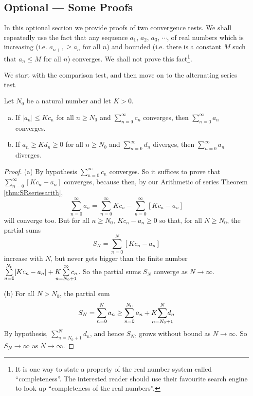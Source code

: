 \subsection{Optional --- Some Proofs}\label{sec:CompProof}

In this optional section we provide proofs of two convergence tests.
We shall repeatedly use the fact that any sequence $a_1$, $a_2$, $a_3$,
$\cdots$, of real numbers which is increasing
(i.e. $a_{n+1}\ge a_n$ for all $n$) and bounded (i.e. there is a constant $M$
such that $a_n\le M$ for all $n$) converges. We shall not prove this
fact\footnote{It is one way to state a property of the real number system
called ``completeness''. The interested reader should use their
favourite search engine to look up ``completeness of the real numbers''.}.

We start with the comparison test, and then move on to the
alternating series test.
\begin{theorem}
Let $N_0$ be a natural number and let $K>0$.
\begin{enumerate}[(a)]
\item If $|a_n|\le K c_n$ for all $n\ge N_0$ and
$\sum\limits_{n=0}^\infty c_n$ converges, then
$\sum\limits_{n=0}^\infty a_n$ converges.
\item If $a_n\ge K d_n\ge0 $ for all $n\ge N_0$ and
$\sum\limits_{n=0}^\infty d_n$ diverges, then
$\sum\limits_{n=0}^\infty a_n$ diverges.
\end{enumerate}
\end{theorem}

\begin{proof}
(a) By hypothesis $\sum_{n=0}^\infty c_n$ converges.
So it suffices to prove that $\sum_{n=0}^\infty [Kc_n-a_n]$
converges, because then, by our Arithmetic of series
Theorem \ref{thm:SRseriesarith},
\begin{equation*}
\sum_{n=0}^\infty a_n
    = \sum_{n=0}^\infty K c_n
    -\sum_{n=0}^\infty [Kc_n-a_n]
\end{equation*}
will converge too. But for all $n\ge N_0$, $Kc_n-a_n\ge 0$ so that,
for all $N\ge N_0$, the partial sums
\begin{equation*}
S_N = \sum_{n=0}^N [Kc_n-a_n]
\end{equation*}
increase with $N$, but never gets bigger than the finite number
$\sum\limits_{n=0}^{N_0} [Kc_n-a_n]
+ K\hskip-10pt\sum\limits_{n=N_0+1}^\infty\hskip-10pt c_n$.
So the partial sums $S_N$ converge as $N\rightarrow\infty$.

\medskip
\noindent (b) For all $N> N_0$, the partial sum
\begin{equation*}
S_N = \sum_{n=0}^N a_n
    \ge \sum_{n=0}^{N_0} a_n + K\hskip-10pt\sum_{n=N_0+1}^N\hskip-10pt d_n
\end{equation*}
By hypothesis, $\sum_{n=N_0+1}^N d_n$, and hence $S_N$, grows without bound as
$N\rightarrow\infty$. So $S_N\rightarrow\infty$  as $N\rightarrow\infty$.
\end{proof}

